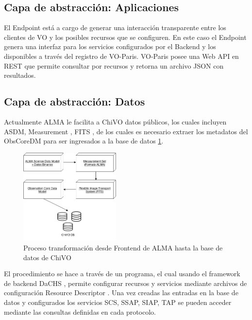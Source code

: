 \subsection{Capa de abstracción: Aplicaciones}

El Endpoint está a cargo de generar una interacción transparente entre los clientes
de VO y los posibles recursos que se configuren.
En este caso el Endpoint genera una interfaz para los servicios configurados por el
Backend y los disponibles a través del registro de VO-Paris.
VO-Paris posee una Web API en REST que permite consultar por recursos y retorna un
archivo JSON con resultados.

\subsection{Capa de abstracción: Datos}

Actualmente ALMA le facilita a ChiVO datos públicos, los cuales incluyen ASDM,
Measurement \cite{petry2012analysing}, FITS \cite{wells1981fits}, de los cuales es
necesario extraer los metadatos del ObsCoreDM para ser ingresados a la base de 
datos \ref{fig:metadata}.

\begin{figure}[h!t]
    \centering
    \includegraphics[width=0.45\textwidth]{images/metadata.png}
    \caption{Proceso transformación desde Frontend de ALMA hasta la base de datos
             de ChiVO}
    \label{fig:metadata}
\end{figure}

El procedimiento se hace a través de un programa, el cual usando el framework de
backend DaCHS \cite{dachs}, permite configurar recursos y servicios mediante
archivos de configuración Resource Descriptor \cite{dachsorguide}.
Una vez creadas las entradas en la base de datos y configurados los servicios SCS,
SSAP, SIAP, TAP se pueden acceder mediante las consultas definidas en cada
protocolo.

